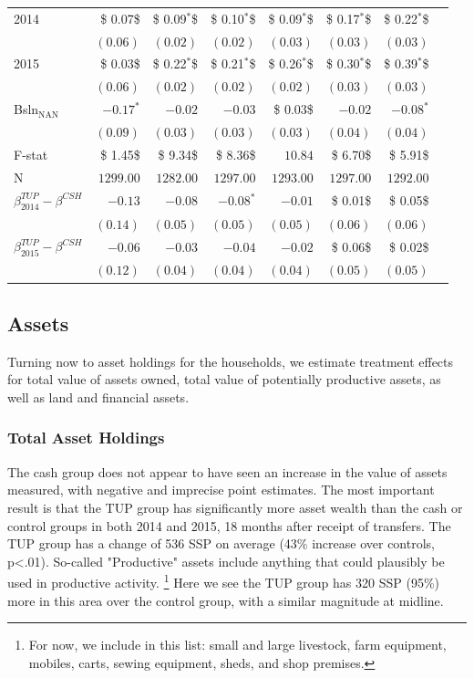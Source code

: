 \documentclass[12pt,article]{article}
\begin{document}
\begin{longtable}{lrrrrrrr}
2014 & \$ 0.07\$ & \$ 0.09$^{\textbf{*}}$\$ & \$ 0.10$^{\textbf{*}}$\$ & \$ 0.09$^{\textbf{*}}$\$ & \$ 0.17$^{\textbf{*}}$\$ & \$ 0.22$^{\textbf{*}}$\$\\
 & $( 0.06)$ & $( 0.02)$ & $( 0.02)$ & $( 0.03)$ & $( 0.03)$ & $( 0.03)$\\
2015 & \$ 0.03\$ & \$ 0.22$^{\textbf{*}}$\$ & \$ 0.21$^{\textbf{*}}$\$ & \$ 0.26$^{\textbf{*}}$\$ & \$ 0.30$^{\textbf{*}}$\$ & \$ 0.39$^{\textbf{*}}$\$\\
 & $( 0.06)$ & $( 0.02)$ & $( 0.02)$ & $( 0.02)$ & $( 0.03)$ & $( 0.03)$\\
Bsln$_{\text{NAN}}$ & $-0.17^{*}$ & $-0.02$ & $-0.03$ & \$ 0.03\$ & $-0.02$ & $-0.08^{*}$\\
 & $( 0.09)$ & $( 0.03)$ & $( 0.03)$ & $( 0.03)$ & $( 0.04)$ & $( 0.04)$\\
\hline
F-stat & \$ 1.45\$ & \$ 9.34\$ & \$ 8.36\$ & $10.84$ & \$ 6.70\$ & \$ 5.91\$\\
N & $1299.00$ & $1282.00$ & $1297.00$ & $1293.00$ & $1297.00$ & $1292.00$\\
\hline
$\beta^{TUP}_{2014}-\beta^{CSH}$ & $-0.13$ & $-0.08$ & $-0.08^{*}$ & $-0.01$ & \$ 0.01\$ & \$ 0.05\$\\
 & $( 0.14)$ & $( 0.05)$ & $( 0.05)$ & $( 0.05)$ & $( 0.06)$ & $( 0.06)$\\
$\beta^{TUP}_{2015}-\beta^{CSH}$ & $-0.06$ & $-0.03$ & $-0.04$ & $-0.02$ & \$ 0.06\$ & \$ 0.02\$\\
 & $( 0.12)$ & $( 0.04)$ & $( 0.04)$ & $( 0.04)$ & $( 0.05)$ & $( 0.05)$\\
\hline
\end{longtable}

\subsection{Assets}
\label{sec-3-4}

Turning now to asset holdings for the households, we estimate treatment effects for total value of assets owned, total
value of potentially productive assets, as well as land and financial assets. 

\subsubsection{Total Asset Holdings}
\label{sec-3-4-1}

The cash group does not appear to have seen an increase in the
value of assets measured, with negative and imprecise point estimates. The most
important result is that the TUP group has significantly more asset wealth than the
cash or control groups in both 2014 and 2015, 18 months after receipt of transfers.
The TUP group has a change of 536 SSP on average (43\% increase over controls, p<.01).
So-called "Productive" assets include anything that could plausibly be used in
productive activity. \footnote{For now, we include in this list: small and large
livestock, farm equipment, mobiles, carts, sewing equipment, sheds, and shop
premises.} Here we see the TUP group has 320 SSP (95\%) more in this area over the
control group, with a similar magnitude at midline.
\end{document}
